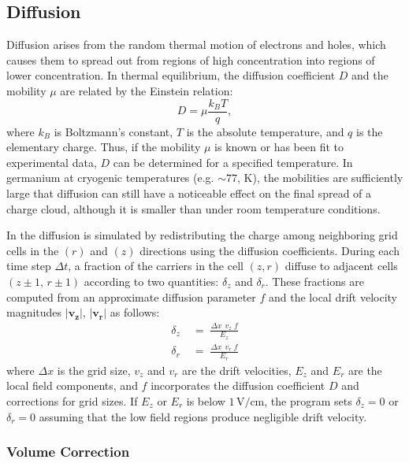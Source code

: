 \subsection{Diffusion}
Diffusion arises from the random thermal motion of electrons and holes, which causes them to spread out from regions of high concentration into regions of lower concentration. In thermal equilibrium, the diffusion coefficient $D$ and the mobility $\mu$
are related by the Einstein relation:
\begin{equation}
D = \mu \frac{k_B T}{q},
\end{equation}
where $k_B$ is Boltzmann's constant, $T$ is the absolute temperature, and $q$ is the elementary charge. Thus, if the mobility $\mu$ is known or has been fit to experimental data, $D$ can be determined for a specified temperature. In germanium at cryogenic temperatures (e.g. $\sim 77$, K), the mobilities are
sufficiently large that diffusion can still have a noticeable effect on the final spread of a charge cloud, although it is smaller than under room temperature conditions.

In {\ehd} the diffusion is simulated by redistributing the charge among neighboring grid cells in the $(r)$ and $(z)$ directions using the diffusion coefficients. During each time step $\Delta t$, a fraction of the carriers in the cell $(z,r)$ diffuse to adjacent cells $(z\pm1,\,r\pm1)$ according to two quantities: $\delta_z$ and $\delta_r$. These fractions are computed from an approximate diffusion parameter $f$ and the local drift velocity magnitudes $\lvert \mathbf{v_z} \rvert$, $\lvert \mathbf{v_r} \rvert$ as follows:
\begin{align}
   \delta_z &\;=\; \frac{\Delta x \;\,v_z \;f}{E_z}\label{eq:deltaez}\\
   \delta_r &\;=\; \frac{\Delta x \;\,v_r \;f}{E_r} \label{eq:deltaer}
\end{align}
where $\Delta x$ is the grid size, $v_{z}$ and $v_{r}$ are the drift velocities, $E_{z}$ and $E_{r}$ are the local field components, and $f$ incorporates the diffusion coefficient $D$ and corrections for grid sizes. If $E_z$ or $E_r$ is below $1\,\mathrm{V/cm}$, the program sets $\delta_z = 0$ or $\delta_r=0$ assuming that the low field regions produce negligible drift velocity.

\subsubsection*{Volume Correction}

